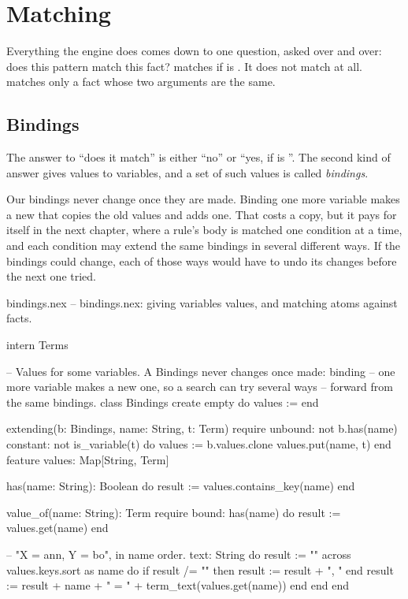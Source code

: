 \chapter{Matching}\label{ch:matching}

Everything the engine does comes down to one question, asked over and over:
does this pattern match this fact?  matches
 if  is . It does not match
 at all.  matches only a fact
whose two arguments are the same.

\section{Bindings}

The answer to ``does it match'' is either ``no'' or ``yes, if  is
''. The second kind of answer gives values to variables, and a
set of such values is called \emph{bindings}.

Our bindings never change once they are made. Binding one more variable
makes a new  that copies the old values and adds one. That
costs a copy, but it pays for itself in the next chapter, where a rule's
body is matched one condition at a time, and each condition may extend the
same bindings in several different ways. If the bindings could change, each
of those ways would have to undo its changes before the next one tried.

\begin{newfile}{bindings.nex}
-- bindings.nex: giving variables values, and matching atoms against facts.

intern Terms

-- Values for some variables. A Bindings never changes once made: binding
-- one more variable makes a new one, so a search can try several ways
-- forward from the same bindings.
class Bindings
create
  empty
  do
    values := {}
  end

  extending(b: Bindings, name: String, t: Term)
  require
    unbound: not b.has(name)
    constant: not is_variable(t)
  do
    values := b.values.clone
    values.put(name, t)
  end
feature
  values: Map[String, Term]

  has(name: String): Boolean
  do
    result := values.contains_key(name)
  end

  value_of(name: String): Term
  require
    bound: has(name)
  do
    result := values.get(name)
  end

  -- "X = ann, Y = bo", in name order.
  text: String
  do
    result := ""
    across values.keys.sort as name do
      if result /= "" then
        result := result + ", "
      end
      result := result + name + " = " + term_text(values.get(name))
    end
  end
end
\end{newfile}


